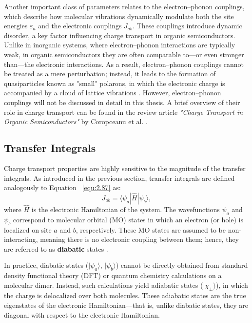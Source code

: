 Another important class of parameters relates to the electron–phonon couplings, which describe how molecular vibrations dynamically modulate both the site energies  $\varepsilon_{a}$ and the electronic couplings $J_{ab}$.
These couplings introduce dynamic disorder, a key factor influencing charge transport in organic semiconductors. 
Unlike in inorganic systems, where electron–phonon interactions are typically weak, in organic semiconductors they are often comparable to—or even stronger than—the electronic interactions. 
As a result, electron–phonon couplings cannot be treated as a mere perturbation; instead, it leads to the formation of quasiparticles known as "small" polarons, in which the electronic charge is accompanied by a cloud of lattice vibrations \cite{Pope1999,Silinsh1994OrganicMC}.
However, electron–phonon couplings will not be discussed in detail in this thesis.
A brief overview of their role in charge transport can be found in the review article \textit{"Charge Transport in Organic Semiconductors"} by Coropceanu et al. \cite{Coropceanu2007}.


\subsection{Transfer Integrals} \label{sec:2.6.2}
Charge transport properties are highly sensitive to the magnitude of the transfer integrals. As introduced in the previous section, transfer integrals are defined analogously to Equation ~\eqref{equ:2.87} as:
\begin{equation} \label{equ:2.88}
    J_{ab} = \langle \psi_a | \hat{H} | \psi_b \rangle,
\end{equation}
where $\hat{H}$ is the electronic Hamiltonian of the system.
The wavefunctions $\psi_a$ and $\psi_b$ correspond to molecular orbital (MO) states in which an electron (or hole) is localized on site $a$ and $b$, respectively.
These MO states are assumed to be non-interacting, meaning there is no electronic coupling between them; hence, they are referred to as \textbf{diabatic} states \cite{Silinsh1994OrganicMC}.

In practice, diabatic states ($|\psi_a\rangle$, $|\psi_b\rangle$) cannot be directly obtained from standard density functional theory (DFT) or quantum chemistry calculations on a molecular dimer.
Instead, such calculations yield adiabatic states ($|\chi_\pm\rangle$), in which the charge is delocalized over both molecules.
These adiabatic states are the true eigenstates of the electronic Hamiltonian—that is, unlike diabatic states, they are diagonal with respect to the electronic Hamiltonian.

